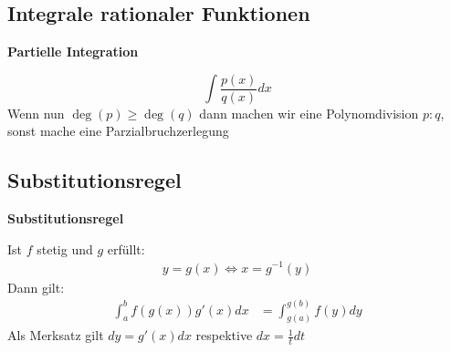 \documentclass{sciposter}
\newenvironment{method}[1]{\begin{mdframed}[backgroundcolor=blue!10,innertopmargin=15pt, innerbottommargin=15pt, nobreak=true]
		\textbf{#1 }
	}
	{ 
	\end{mdframed}
}
\begin{document}
\begin{multicols}{2}
\subsection*{Integrale rationaler Funktionen}
\begin{method}{Partielle Integration}
	$$\int \frac{p(x)}{q(x)} dx$$
	Wenn nun $\deg(p) \geq \deg(q)$ dann machen wir eine Polynomdivision $p:q$, sonst mache eine Parzialbruchzerlegung
\end{method}

\subsection*{Substitutionsregel}
\begin{method}{Substitutionsregel}
	Ist $f$ stetig und $g$ erfüllt:
	\begin{align*}
	y = g(x) \iff x = g^{-1}(y)
	\end{align*}
	Dann gilt:
	\begin{align*}
	\int_a ^b f(g(x))g'(x) dx &= \int_{g(a)}^{g(b)} f(y) dy
	\end{align*}
	Als Merksatz gilt $dy = g'(x) dx$ respektive $dx = \frac{1}{t} dt$
\end{method}


\vfill\null
\columnbreak



\end{multicols}
\end{document}
